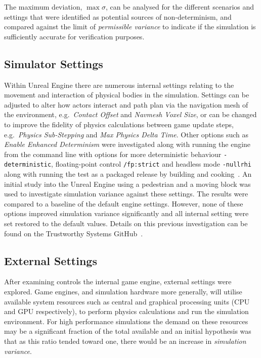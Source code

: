The maximum deviation, $\max\sigma$, can be analysed for the different scenarios and settings that were identified as potential sources of non-determinism, and compared against the limit of \textit{permissible variance} to indicate if the simulation is sufficiently accurate for verification purposes.


\subsection{Simulator Settings}

Within Unreal Engine there are numerous internal settings relating to the movement and interaction of physical bodies in the simulation. Settings can be adjusted to alter how actors interact and path plan via the navigation mesh of the environment, e.g.\ \textit{Contact Offset} and \textit{Navmesh Voxel Size}, or can be changed to improve the fidelity of physics calculations between game update steps, e.g.\ \textit{Physics Sub-Stepping} and \textit{Max Physics Delta Time}. Other options such as \textit{Enable Enhanced Determinism} were investigated along with running the engine from the command line with options for more deterministic behaviour \texttt{-deterministic}, floating-point control \texttt{/fp:strict} and headless mode \texttt{-nullrhi} along with running the test as a packaged release by building and cooking~\cite{releasing_project}. An initial study into the Unreal Engine using a pedestrian and a moving block was used to investigate simulation variance against these settings. The results were compared to a baseline of the default engine settings. However, none of these options improved simulation variance significantly and all internal setting were set restored to the default values. Details on this previous investigation can be found on the Trustworthy Systems GitHub~\cite{TSLUnrealEngineTesting}. 

\subsection{External Settings}

After examining controls the internal game engine, external settings were explored. Game engines, and simulation hardware more generally, will utilise available system resources such as central and graphical processing units (CPU and GPU respectively), to perform physics calculations and run the simulation environment. For high performance simulations the demand on these resources may be a significant fraction of the total available and an initial hypothesis was that as this ratio tended toward one, there would be an increase in \textit{simulation variance}.

